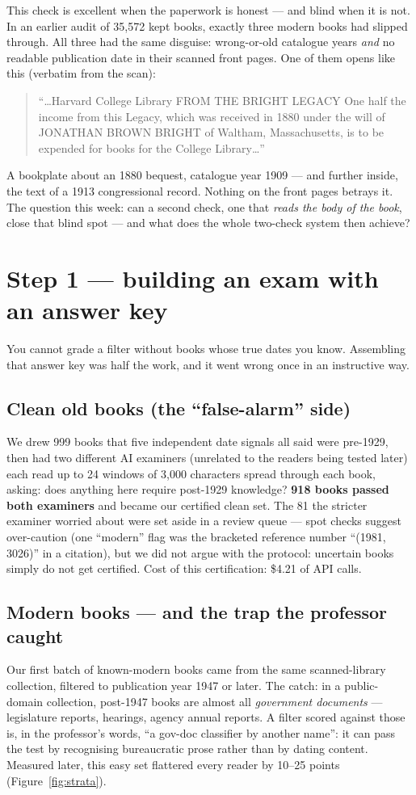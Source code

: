 \documentclass[11pt]{article}
\newenvironment{example}{\begin{quote}\small\begin{sffamily}}{\end{sffamily}\end{quote}}
\begin{document}
This check is excellent when the paperwork is honest --- and blind when it is not. In an earlier audit
of 35{,}572 kept books, exactly three modern books had slipped through. All three had the same disguise:
wrong-or-old catalogue years \emph{and} no readable publication date in their scanned front pages. One
of them opens like this (verbatim from the scan):

\begin{example}
``\ldots Harvard College Library FROM THE BRIGHT LEGACY One half the income from this Legacy, which was
received in 1880 under the will of JONATHAN BROWN BRIGHT of Waltham, Massachusetts, is to be expended
for books for the College Library\ldots''
\end{example}

A bookplate about an 1880 bequest, catalogue year 1909 --- and further inside, the text of a 1913
congressional record. Nothing on the front pages betrays it. The question this week: can a second
check, one that \emph{reads the body of the book}, close that blind spot --- and what does the whole
two-check system then achieve?

\section{Step 1 --- building an exam with an answer key}
You cannot grade a filter without books whose true dates you know. Assembling that answer key was
half the work, and it went wrong once in an instructive way.

\subsection{Clean old books (the ``false-alarm'' side)}
We drew 999 books that five independent date signals all said were pre-1929, then had two different AI
examiners (unrelated to the readers being tested later) each read up to 24 windows of 3{,}000
characters spread through each book, asking: does anything here require post-1929 knowledge?
\textbf{918 books passed both examiners} and became our certified clean set. The 81 the stricter
examiner worried about were set aside in a review queue --- spot checks suggest over-caution (one
``modern'' flag was the bracketed reference number ``(1981, 3026)'' in a citation), but we did not
argue with the protocol: uncertain books simply do not get certified. Cost of this certification:
\$4.21 of API calls.

\subsection{Modern books --- and the trap the professor caught}
Our first batch of known-modern books came from the same scanned-library collection, filtered to
publication year 1947 or later. The catch: in a public-domain collection, post-1947 books are almost
all \emph{government documents} --- legislature reports, hearings, agency annual reports. A filter
scored against those is, in the professor's words, ``a gov-doc classifier by another name'': it can
pass the test by recognising bureaucratic prose rather than by dating content. Measured later, this
easy set flattered every reader by 10--25 points (Figure~\ref{fig:strata}).
\end{document}
